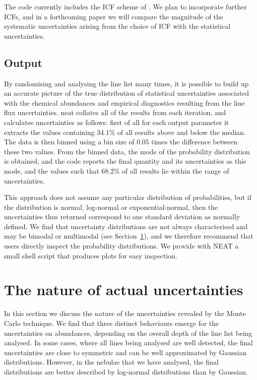 \documentclass[useAMS,usenatbib]{mn2e}
\begin{document}
The code currently includes the ICF scheme of \citet{1994MNRAS.271..257K}.  We plan to incorporate further ICFs, and in a forthcoming paper we will compare the magnitude of the systematic uncertainties arising from the choice of ICF with the statistical uncertainties.

\subsection{Output}

By randomising and analysing the line list many times, it is possible to build up an accurate picture of the true distribution of statistical uncertainties associated with the chemical abundances and empirical diagnostics resulting from the line flux uncertainties. {\sc neat} collates all of the results from each iteration, and calculates uncertainties as follows: first of all for each output parameter it extracts the values containing 34.1\% of all results above and below the median.  The data is then binned using a bin size of 0.05 times the difference between these two values.  From the binned data, the mode of the probability distribution is obtained, and the code reports the final quantity and its uncertainties as this mode, and the values such that 68.2\% of all results lie within the range of uncertainties.

This approach does not assume any particular distribution of probabilities, but if the distribution is normal, log-normal or exponential-normal, then the uncertainties thus returned correspond to one standard deviation as normally defined.  We find that uncertainty distributions are not always characterised and may be bimodal or multimodal (see Section~\ref{natureofuncertainties}), and we therefore recommend that users directly inspect the probability distributions.  We provide with {\sc NEAT} a small shell script that produces plots for easy inspection.

\section{The nature of actual uncertainties}
\label{natureofuncertainties}

In this section we discuss the nature of the uncertainties revealed by the Monte Carlo technique.  We find that three distinct behaviours emerge for the uncertainties on abundances, depending on the overall depth of the line list being analysed.  In some cases, where all lines being analysed are well detected, the final uncertainties are close to symmetric and can be well approximated by Gaussian distributions.  However, in the nebulae that we have analysed, the final distributions are better described by log-normal distributions than by Gaussian.
\end{document}
